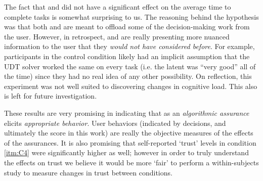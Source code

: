 The fact that \xQ{} and \xO{} did not have a significant effect on the average time to complete tasks is somewhat surprising to us. The reasoning behind the hypothesis was that both \xQ{} and \xO{} are meant to offload some of the decision-making work from the user. However, in retrospect, \xQ{} and \xO{} are really presenting more nuanced information to the user that they \emph{would not have considered before}. For example, participants in the control condition likely had an implicit assumption that the UDT solver worked the same on every task (i.e. the latent \xQ{} was ``very good'' all of the time) since they had no real idea of any other possibility. On reflection, this experiment was not well suited to discovering changes in cognitive load. This also is left for future investigation.

These results are very promising in indicating that \famsec{} as an \emph{algorithmic assurance} elicits \emph{appropriate behavior}. User behaviors (indicated by decisions, and ultimately the score in this work) are really the objective measures of the effects of the assurances. It is also promising that self-reported `trust' levels in condition \ref{itm:C4} were significantly higher as well; however in order to truly understand the effects on trust we believe it would be more `fair' to perform a within-subjects study to measure changes in trust between conditions.

%
